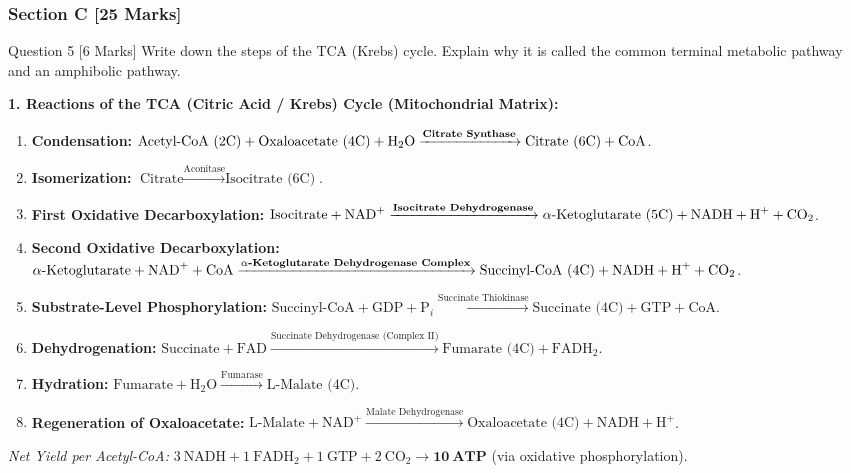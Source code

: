\documentclass[11pt,a4paper]{article}
\begin{document}
\subsubsection{Section C [25 Marks]}

\begin{qbox}{Question 5 [6 Marks]}
Write down the steps of the TCA (Krebs) cycle. Explain why it is called the common terminal metabolic pathway and an amphibolic pathway.
\end{qbox}

\begin{ansbox}
\textbf{1. Reactions of the TCA (Citric Acid / Krebs) Cycle (Mitochondrial Matrix):}
\begin{enumerate}[leftmargin=*]
    \item \textbf{Condensation:} $\text{Acetyl-CoA (2C)} + \text{Oxaloacetate (4C)} + \text{H}_2\text{O} \xrightarrow{\text{\textbf{Citrate Synthase}}} \text{Citrate (6C)} + \text{CoA}$.
    \item \textbf{Isomerization:} $\text{Citrate} \xrightarrow{\text{Aconitase}} \text{Isocitrate (6C)}$.
    \item \textbf{First Oxidative Decarboxylation:} $\text{Isocitrate} + \text{NAD}^+ \xrightarrow{\text{\textbf{Isocitrate Dehydrogenase}}} \alpha\text{-Ketoglutarate (5C)} + \text{NADH} + \text{H}^+ + \text{CO}_2$.
    \item \textbf{Second Oxidative Decarboxylation:} $\alpha\text{-Ketoglutarate} + \text{NAD}^+ + \text{CoA} \xrightarrow{\text{\textbf{$\alpha$-Ketoglutarate Dehydrogenase Complex}}} \text{Succinyl-CoA (4C)} + \text{NADH} + \text{H}^+ + \text{CO}_2$.
    \item \textbf{Substrate-Level Phosphorylation:} $\text{Succinyl-CoA} + \text{GDP} + \text{P}_i \xrightarrow{\text{Succinate Thiokinase}} \text{Succinate (4C)} + \text{GTP} + \text{CoA}$.
    \item \textbf{Dehydrogenation:} $\text{Succinate} + \text{FAD} \xrightarrow{\text{Succinate Dehydrogenase (Complex II)}} \text{Fumarate (4C)} + \text{FADH}_2$.
    \item \textbf{Hydration:} $\text{Fumarate} + \text{H}_2\text{O} \xrightarrow{\text{Fumarase}} \text{L-Malate (4C)}$.
    \item \textbf{Regeneration of Oxaloacetate:} $\text{L-Malate} + \text{NAD}^+ \xrightarrow{\text{Malate Dehydrogenase}} \text{Oxaloacetate (4C)} + \text{NADH} + \text{H}^+$.
\end{enumerate}
\textit{Net Yield per Acetyl-CoA:} $3\ \text{NADH} + 1\ \text{FADH}_2 + 1\ \text{GTP} + 2\ \text{CO}_2 \rightarrow \mathbf{10\ \text{ATP}}$ (via oxidative phosphorylation).


\end{ansbox}
\end{document}

